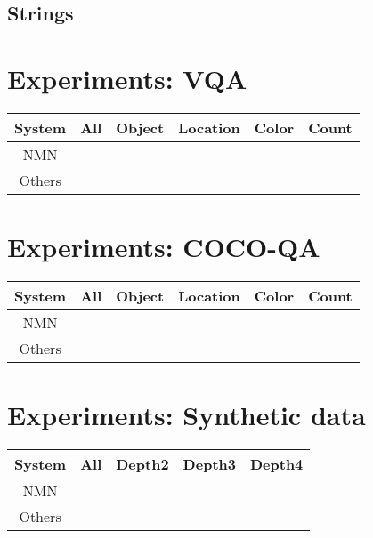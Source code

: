\documentclass{article} %
\theoremstyle{definition}
\theoremstyle{example}
\begin{document}
\subsection{Strings}


\section{Experiments: VQA}

\begin{table}
  \center
  \begin{tabular}{cccccc}
    \toprule
    System & All & Object & Location & Color & Count \\
    \midrule
    NMN \\
    Others \\
    \bottomrule
  \end{tabular}
\end{table}

\section{Experiments: COCO-QA}

\begin{table}
  \center
  \begin{tabular}{cccccc}
    \toprule
    System & All & Object & Location & Color & Count \\
    \midrule
    NMN \\
    Others \\
    \bottomrule
  \end{tabular}
\end{table}

\section{Experiments: Synthetic data}

\begin{table}
  \center
  \begin{tabular}{ccccc}
    \toprule
    System & All & Depth2 & Depth3 & Depth4 \\
    \midrule
    NMN \\
    Others \\
    \bottomrule
  \end{tabular}
\end{table}
\end{document}

